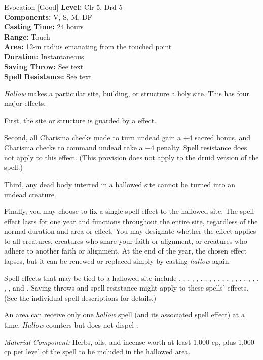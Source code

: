 {Evocation [Good]}
{
	\textbf{Level:}
	Clr 5, Drd 5\\
	\textbf{Components:}
	V, S, M, DF\\
	\textbf{Casting Time:}
	24 hours\\
	\textbf{Range:}
	Touch\\
	\textbf{Area:}
	12-m radius emanating from the touched point\\
	\textbf{Duration:}
	Instantaneous\\
	\textbf{Saving Throw:}
	See text\\
	\textbf{Spell Resistance:}
	See text\\
}
{
	\emph{Hallow} makes a particular site, building, or structure a holy site. This has four major effects.

	First, the site or structure is guarded by a  effect.

	Second, all Charisma checks made to turn undead gain a +4 sacred bonus, and Charisma checks to command undead take a $-4$ penalty. Spell resistance does not apply to this effect. (This provision does not apply to the druid version of the spell.)

	Third, any dead body interred in a hallowed site cannot be turned into an undead creature.

	Finally, you may choose to fix a single spell effect to the hallowed site. The spell effect lasts for one year and functions throughout the entire site, regardless of the normal duration and area or effect. You may designate whether the effect applies to all creatures, creatures who share your faith or alignment, or creatures who adhere to another faith or alignment. At the end of the year, the chosen effect lapses, but it can be renewed or replaced simply by casting \emph{hallow} again.

	Spell effects that may be tied to a hallowed site include , , , , , , , , , , , , , , , , , , , , , and . Saving throws and spell resistance might apply to these spells' effects. (See the individual spell descriptions for details.)

	An area can receive only one \emph{hallow} spell (and its associated spell effect) at a time. \emph{Hallow} counters but does not dispel .

	\textit{Material Component:}
	Herbs, oils, and incense worth at least 1,000 cp, plus 1,000 cp per level of the spell to be included in the hallowed area.

}
